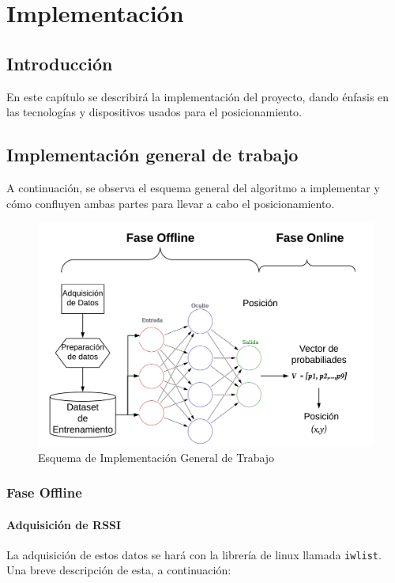 \chapter{Implementación}
\section{Introducción}

En este capítulo se describirá la implementación del proyecto, dando énfasis en las tecnologías y dispositivos usados para el posicionamiento.

\section{Implementación general de trabajo}
A continuación, se observa el esquema general del algoritmo a implementar y cómo confluyen ambas partes para llevar a cabo el posicionamiento.

\begin{figure}[h!]
    \centering
    \includegraphics[scale=0.15]{./images/esquema2}
    \caption{Esquema de Implementación General de Trabajo}
    \label{fig:esquema2}
\end{figure}


\subsection{Fase Offline}
\subsubsection{Adquisición de RSSI}
La adquisición de estos datos se hará con la librería de linux llamada \texttt{iwlist}. Una breve descripción de esta, a continuación:

